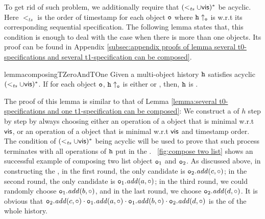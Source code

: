 
To get rid of such problem, we additionally require that $(<_{\mathit{ts}} \cup \mathsf{vis})^*$ be acyclic. Here $<_{\mathit{ts}}$ is the order of timestamp for each object $\mathtt{o}$ where $\mathtt{h} \uparrow_{\mathtt{o}}$ is \tonelinearizable{} w.r.t its corresponding sequential specification. The following lemma states that, this condition is enough to deal with the case when there is more than one \tonelinearizable{} objects. Its proof can be found in Appendix \ref{subsec:appendix proofs of lemma several t0-specifications and several t1-specification can be composed}.

\begin{restatable}{lemma}{composingTZeroAndTOne}
\label{lemma:several t0-specifications and several t1-specification can be composed}
Given a multi-object history $\mathtt{h}$ satisfies acyclic $(<_{\mathit{ts}} \cup \mathsf{vis})^*$. If for each object $\mathtt{o}$, $\mathtt{h} \uparrow_{\mathtt{o}}$ is either \tzerolinearizable{} or \tonelinearizable{}, then, $\mathtt{h}$ is \crdtlinearizable{}.
\end{restatable}

The proof of this lemma is similar to that of Lemma \ref{lemma:several t0-specifications and one t1-specification can be composed}: We construct a \crdtlinearization of $h$ step by step by always choosing either an operation of a \tzerolin{} object that is minimal w.r.t $\mathsf{vis}$, or an operation of a \tonelin{} object that is minimal w.r.t $\mathsf{vis}$ and timestamp order. The condition of $(<_{\mathit{ts}} \cup \mathsf{vis})^*$ being acyclic will be used to prove that such process terminates with all operations of $\mathtt{h}$ put in the \crdtlinearization. \figurename~\ref{fig:compose two list} shows an successful example of composing two \tonelinearizable list object $\mathtt{o}_1$ and $\mathtt{o}_2$. As discussed above, in constructing the \crdtlinearization, in the first round, the only candidate is $\mathtt{o}_2.\mathit{add}(c,\circ)$; in the second round, the only candidate is $\mathtt{o}_1.\mathit{add}(a,\circ)$; in the third round, we could randomly choose $\mathtt{o}_1.\mathit{add}(b,\circ)$, and in the last round, we choose $\mathtt{o}_2.\mathit{add}(d,\circ)$. It is obvious that  $\mathtt{o}_2.\mathit{add}(c,\circ) \cdot \mathtt{o}_1.\mathit{add}(a,\circ) \cdot \mathtt{o}_1.\mathit{add}(b,\circ) \cdot \mathtt{o}_2.\mathit{add}(d,\circ)$ is the \crdtlinearization of the whole history.

